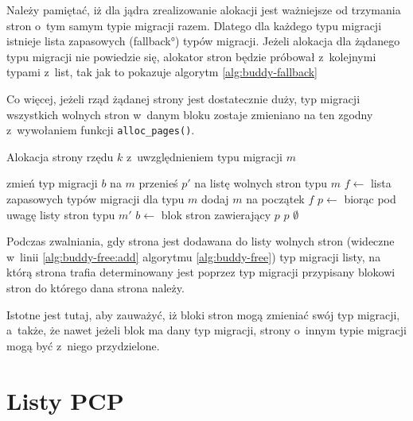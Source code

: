 Należy pamiętać, iż dla jądra zrealizowanie alokacji jest ważniejsze
od trzymania stron o~tym samym typie migracji razem.  Dlatego dla
każdego typu migracji istnieje lista zapasowych (\ang{fallback}) typów
migracji.  Jeżeli alokacja dla żądanego typu migracji nie powiedzie
się, alokator stron będzie próbował z~kolejnymi typami z~list, tak jak
to pokazuje algorytm \ref{alg:buddy-fallback}

Co więcej, jeżeli rząd żądanej strony jest dostatecznie duży, typ
migracji wszystkich wolnych stron w~danym bloku zostaje zmieniano na
ten zgodny z~wywołaniem funkcji \lstinline|alloc_pages()|.

\begin{algorithm}\label{alg:buddy-fallback}
\caption{Alokacja strony rzędu $k$ z~uwzględnieniem typu migracji $m$}
\begin{algorithmic}[1]
\State zmień typ migracji $b$ na $m$
    \State przenieś $p'$ na listę wolnych stron typu $m$
\EndFor
\EndFunction
\Statex
{}
    \State $f \gets$ lista zapasowych typów migracji dla typu $m$
    \State dodaj $m$ na początek $f$
        \State $p \gets$  biorąc pod uwagę listy stron typu $m'$
                \State $b \gets$ blok stron zawierający $p$
                \State {}
            \EndIf
            \State \Return $p$
        \EndIf
    \EndFor
    \State \Return $\emptyset$
\EndFunction
\end{algorithmic}
\end{algorithm}

Podczas zwalniania, gdy strona jest dodawana do listy wolnych stron
(wideczne w~linii \ref{alg:buddy-free:add} algorytmu
\ref{alg:buddy-free}) typ migracji listy, na którą strona trafia
determinowany jest poprzez typ migracji przypisany blokowi stron do
którego dana strona należy.

Istotne jest tutaj, aby zauważyć, iż bloki stron mogą zmieniać swój
typ migracji, a~także, że nawet jeżeli blok ma dany typ migracji,
strony o~innym typie migracji mogą być z~niego przydzielone.


\section{Listy PCP}\label{sec:pcp-lists}

